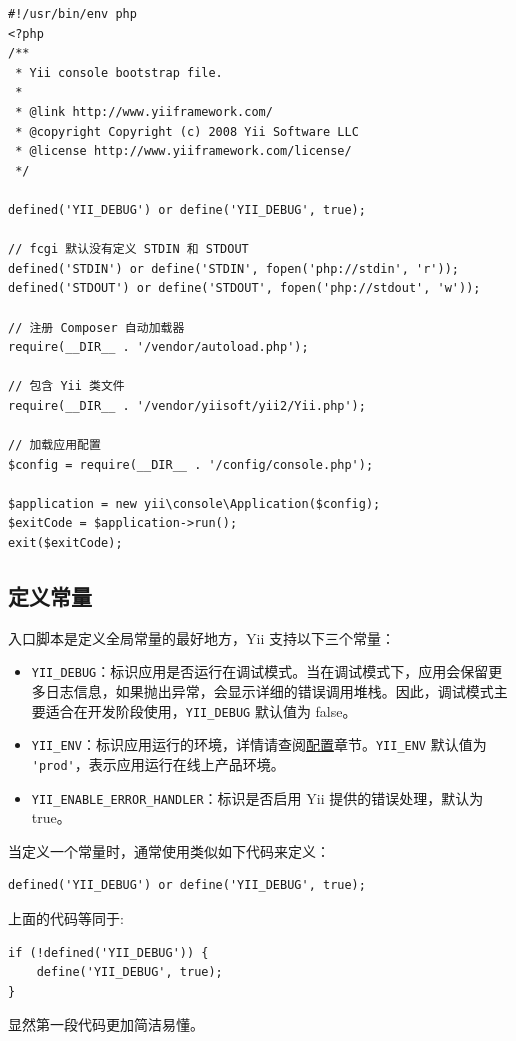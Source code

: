 \lstset{language=php}\begin{lstlisting}
#!/usr/bin/env php
<?php
/**
 * Yii console bootstrap file.
 *
 * @link http://www.yiiframework.com/
 * @copyright Copyright (c) 2008 Yii Software LLC
 * @license http://www.yiiframework.com/license/
 */

defined('YII_DEBUG') or define('YII_DEBUG', true);

// fcgi 默认没有定义 STDIN 和 STDOUT
defined('STDIN') or define('STDIN', fopen('php://stdin', 'r'));
defined('STDOUT') or define('STDOUT', fopen('php://stdout', 'w'));

// 注册 Composer 自动加载器
require(__DIR__ . '/vendor/autoload.php');

// 包含 Yii 类文件
require(__DIR__ . '/vendor/yiisoft/yii2/Yii.php');

// 加载应用配置
$config = require(__DIR__ . '/config/console.php');

$application = new yii\console\Application($config);
$exitCode = $application->run();
exit($exitCode);
\end{lstlisting}
\subsection{定义常量 \label{structure-entry-scripts.md::defining-constants}}
入口脚本是定义全局常量的最好地方，Yii 支持以下三个常量：

\begin{itemize}
\item \lstinline|YII_DEBUG|：标识应用是否运行在调试模式。当在调试模式下，应用会保留更多日志信息，如果抛出异常，会显示详细的错误调用堆栈。因此，调试模式主要适合在开发阶段使用，\lstinline|YII_DEBUG| 默认值为 false。
\item \lstinline|YII_ENV|：标识应用运行的环境，详情请查阅\hyperref[concept-configurations.md::environment-constants]{配置}章节。\lstinline|YII_ENV| 默认值为 \lstinline|'prod'|，表示应用运行在线上产品环境。
\item \lstinline|YII_ENABLE_ERROR_HANDLER|：标识是否启用 Yii 提供的错误处理，默认为 true。
\end{itemize}
当定义一个常量时，通常使用类似如下代码来定义：

\lstset{language=php}\begin{lstlisting}
defined('YII_DEBUG') or define('YII_DEBUG', true);
\end{lstlisting}
上面的代码等同于:

\lstset{language=php}\begin{lstlisting}
if (!defined('YII_DEBUG')) {
    define('YII_DEBUG', true);
}
\end{lstlisting}
显然第一段代码更加简洁易懂。

